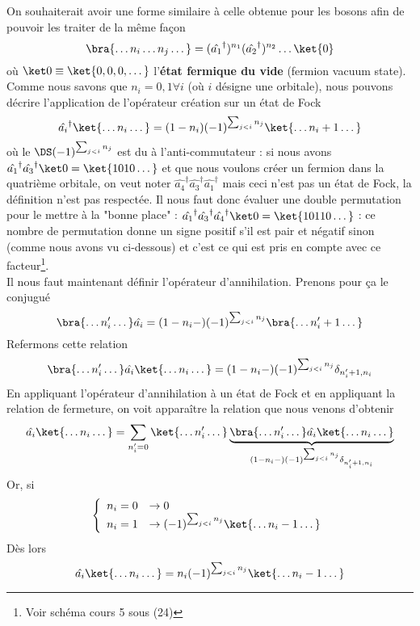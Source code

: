 On souhaiterait avoir une forme similaire à celle obtenue pour les bosons afin de pouvoir les 
traiter de la même façon
\begin{equation}
\bra{\dots n_i\dots n_j\dots} = (\hat{a_1}^\dagger)^{n_1}(\hat{a_2}^\dagger)^{n_2}\dots\ket{0}
\end{equation}
où $\ket0\equiv \ket{0,0,0,\dots}$ l'\textbf{état fermique du vide} (fermion vacuum state). Comme 
nous savons que $n_i=0,1 \forall i$ (où $i$ désigne une orbitale), nous pouvons décrire l'application 
de l'opérateur création sur un état de Fock
\begin{equation}
\hat{a_i}^\dagger \ket{\dots n_i\dots} = (1-n_i)(-1)^{\sum_{j<i}n_j}\ket{\dots n_i+1\dots}
\end{equation}
où le $\DS (-1)^{\sum_{j<i}n_j}$ est du à l'anti-commutateur : si nous avons $\hat{a_1}^\dagger
\hat{a_3}^\dagger\ket0 = \ket{1010\dots}$ et que nous voulons créer un fermion dans la quatrième orbitale, 
on veut noter $\hat{a_4}^\dagger\hat{a_3}^\dagger\hat{a_1}^\dagger$ mais ceci n'est pas un état de 
Fock, la définition n'est pas respectée. Il nous faut donc évaluer une double permutation pour le 
mettre à la "bonne place" : $\hat{a_1}^\dagger\hat{a_3}^\dagger\hat{a_4}^\dagger\ket0=\ket{10110\dots}$ : 
ce nombre de permutation donne un signe positif s'il est pair et négatif sinon (comme nous avons vu 
ci-dessous) et c'est ce qui est pris en compte avec ce facteur\footnote{Voir schéma cours 5 sous (24)}.\\

Il nous faut maintenant définir l'opérateur d'annihilation. Prenons pour ça le conjugué
\begin{equation}
\bra{\dots n_i'\dots}\hat{a_i} = (1-n_i-)(-1)^{\sum_{j<i}n_j}\bra{\dots n_i'+1\dots}
\end{equation}
Refermons cette relation
\begin{equation}
\bra{\dots n_i'\dots}\hat{a_i}\ket{\dots n_i\dots} = (1-n_i-)(-1)^{\sum_{j<i}n_j}
\delta_{n_i'+1,n_i}
\end{equation}
En appliquant l'opérateur d'annihilation à un état de Fock et en appliquant la relation de fermeture,
on voit apparaître la relation que nous venons d'obtenir
\begin{equation}
\hat{a_i}\ket{\dots n_i\dots} = \sum_{n_i'=0} \ket{\dots n_i'\dots}
\underbrace{\bra{\dots n_i'\dots}\hat{a_i}\ket{\dots n_i\dots}}_{ (1-n_i-)(-1)^{\sum_{j<i}n_j}
\delta_{n_i'+1,n_i}}
\end{equation}
Or, si
\begin{equation}
\left\{\begin{array}{ll}
n_i = 0 &\rightarrow 0\\
n_i = 1 &\rightarrow (-1)^{\sum_{j<i}n_j}\ket{\dots n_i-1\dots}
\end{array}\right.
\end{equation}
Dès lors
\begin{equation}
\hat{a_i}\ket{\dots n_i\dots} = n_i(-1)^{\sum_{j<i}n_j}\ket{\dots n_i-1\dots}
\end{equation}



